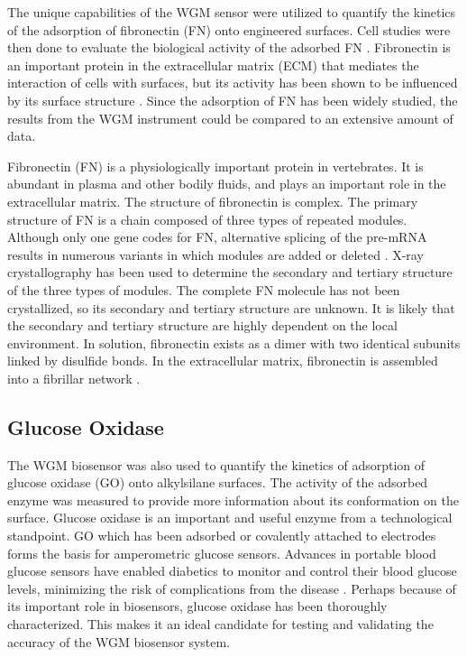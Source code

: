 The unique capabilities of the WGM sensor were utilized to quantify
the kinetics of the adsorption of fibronectin (FN) onto engineered
surfaces. Cell studies were then done to evaluate the biological activity
of the adsorbed FN \cite{Keselowsky2004}. Fibronectin is an important
protein in the extracellular matrix (ECM) that mediates the interaction
of cells with surfaces, but its activity has been shown to be influenced
by its surface structure \cite{Lan2005,Michael2003}. Since the adsorption
of FN has been widely studied, the results from the WGM instrument
could be compared to an extensive amount of data. 

Fibronectin (FN) is a physiologically important protein in vertebrates.
It is abundant in plasma and other bodily fluids, and plays an important
role in the extracellular matrix. The structure of fibronectin is
complex. The primary structure of FN is a chain composed of three
types of repeated modules. Although only one gene codes for FN, alternative
splicing of the pre-mRNA results in numerous variants in which modules
are added or deleted \cite{Pankov2002}. X-ray crystallography has
been used to determine the secondary and tertiary structure of the
three types of modules. The complete FN molecule has not been crystallized,
so its secondary and tertiary structure are unknown. It is likely
that the secondary and tertiary structure are highly dependent on
the local environment. In solution, fibronectin exists as a dimer
with two identical subunits linked by disulfide bonds. In the extracellular
matrix, fibronectin is assembled into a fibrillar network \cite{Mao2005}.


\subsection{Glucose Oxidase}

The WGM biosensor was also used to quantify the kinetics of adsorption
of glucose oxidase (GO) onto alkylsilane surfaces. The activity of
the adsorbed enzyme was measured to provide more information about
its conformation on the surface. Glucose oxidase is an important and
useful enzyme from a technological standpoint. GO which has been adsorbed
or covalently attached to electrodes forms the basis for amperometric
glucose sensors\cite{Wang2007}. Advances in portable blood glucose
sensors have enabled diabetics to monitor and control their blood
glucose levels, minimizing the risk of complications from the disease
\cite{Oliver2009}. Perhaps because of its important role in biosensors,
glucose oxidase has been thoroughly characterized. This makes it an
ideal candidate for testing and validating the accuracy of the WGM
biosensor system. 

